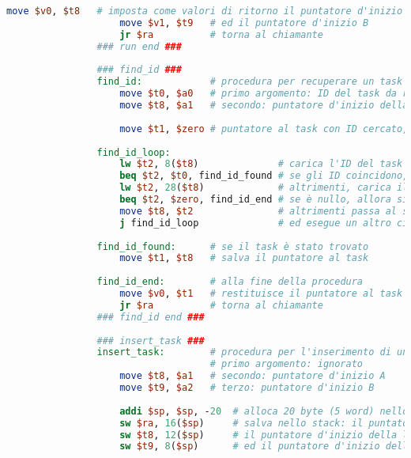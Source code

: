 \begin{center}
\begin{lstlisting}[language=mips, gobble=14, stepnumber=1]
                    move $v0, $t8   # imposta come valori di ritorno il puntatore d'inizio A
                    move $v1, $t9   # ed il puntatore d'inizio B
                    jr $ra          # torna al chiamante
                ### run end ###
                
                ### find_id ###
                find_id:            # procedura per recuperare un task con un ID specifico
                    move $t0, $a0   # primo argomento: ID del task da recuperare
                    move $t8, $a1   # secondo: puntatore d'inizio della lista A
                    
                    move $t1, $zero # puntatore al task con ID cercato, inizializzato come nullo
                    
                find_id_loop:
                    lw $t2, 8($t8)              # carica l'ID del task attuale
                    beq $t2, $t0, find_id_found # se gli ID coincidono, allora il task è stato trovato
                    lw $t2, 28($t8)             # altrimenti, carica il puntatore al task successivo
                    beq $t2, $zero, find_id_end # se è nullo, allora si è raggiunta la fine senza trovare il task
                    move $t8, $t2               # altrimenti passa al successivo
                    j find_id_loop              # ed esegue un altro ciclo
                    
                find_id_found:      # se il task è stato trovato
                    move $t1, $t8   # salva il puntatore al task
                    
                find_id_end:        # alla fine della procedura
                    move $v0, $t1   # restituisce il puntatore al task trovato, o null se non è stato trovato
                    jr $ra          # torna al chiamante
                ### find_id end ###
                
                ### insert_task ###
                insert_task:		# procedura per l'inserimento di un nuovo task
                					# primo argomento: ignorato
                    move $t8, $a1	# secondo: puntatore d'inizio A
                    move $t9, $a2	# terzo: puntatore d'inizio B
                    
                    addi $sp, $sp, -20	# alloca 20 byte (5 word) nello stack frame
                    sw $ra, 16($sp)		# salva nello stack: il puntatore di ritorno al chiamante
                    sw $t8, 12($sp)		# il puntatore d'inizio della lista A
                    sw $t9, 8($sp)		# ed il puntatore d'inizio della lista B
                

\end{lstlisting}
\end{center}
